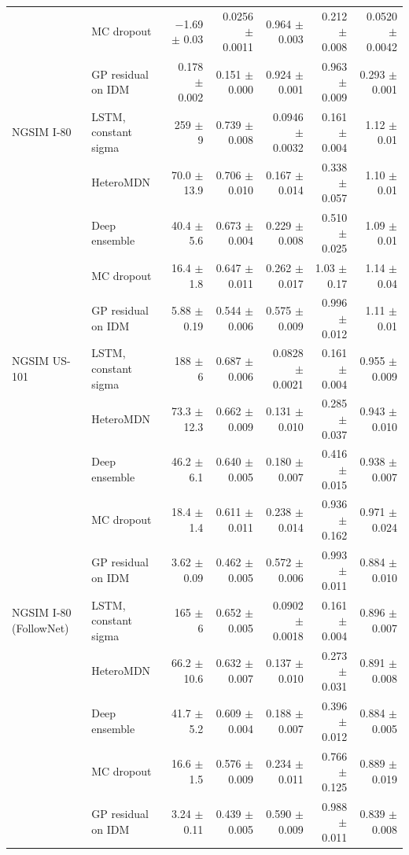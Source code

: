 \begin{table}[htbp]
\begin{tabular}{llrrrrr}
 & MC dropout & $-$1.69 $\pm$ 0.03 & 0.0256 $\pm$ 0.0011 & 0.964 $\pm$ 0.003 & 0.212 $\pm$ 0.008 & 0.0520 $\pm$ 0.0042 \\
 & GP residual on IDM & 0.178 $\pm$ 0.002 & 0.151 $\pm$ 0.000 & 0.924 $\pm$ 0.001 & 0.963 $\pm$ 0.009 & 0.293 $\pm$ 0.001 \\
\midrule
NGSIM I-80 & LSTM, constant sigma & 259 $\pm$ 9 & 0.739 $\pm$ 0.008 & 0.0946 $\pm$ 0.0032 & 0.161 $\pm$ 0.004 & 1.12 $\pm$ 0.01 \\
 & HeteroMDN & 70.0 $\pm$ 13.9 & 0.706 $\pm$ 0.010 & 0.167 $\pm$ 0.014 & 0.338 $\pm$ 0.057 & 1.10 $\pm$ 0.01 \\
 & Deep ensemble & 40.4 $\pm$ 5.6 & 0.673 $\pm$ 0.004 & 0.229 $\pm$ 0.008 & 0.510 $\pm$ 0.025 & 1.09 $\pm$ 0.01 \\
 & MC dropout & 16.4 $\pm$ 1.8 & 0.647 $\pm$ 0.011 & 0.262 $\pm$ 0.017 & 1.03 $\pm$ 0.17 & 1.14 $\pm$ 0.04 \\
 & GP residual on IDM & 5.88 $\pm$ 0.19 & 0.544 $\pm$ 0.006 & 0.575 $\pm$ 0.009 & 0.996 $\pm$ 0.012 & 1.11 $\pm$ 0.01 \\
\midrule
NGSIM US-101 & LSTM, constant sigma & 188 $\pm$ 6 & 0.687 $\pm$ 0.006 & 0.0828 $\pm$ 0.0021 & 0.161 $\pm$ 0.004 & 0.955 $\pm$ 0.009 \\
 & HeteroMDN & 73.3 $\pm$ 12.3 & 0.662 $\pm$ 0.009 & 0.131 $\pm$ 0.010 & 0.285 $\pm$ 0.037 & 0.943 $\pm$ 0.010 \\
 & Deep ensemble & 46.2 $\pm$ 6.1 & 0.640 $\pm$ 0.005 & 0.180 $\pm$ 0.007 & 0.416 $\pm$ 0.015 & 0.938 $\pm$ 0.007 \\
 & MC dropout & 18.4 $\pm$ 1.4 & 0.611 $\pm$ 0.011 & 0.238 $\pm$ 0.014 & 0.936 $\pm$ 0.162 & 0.971 $\pm$ 0.024 \\
 & GP residual on IDM & 3.62 $\pm$ 0.09 & 0.462 $\pm$ 0.005 & 0.572 $\pm$ 0.006 & 0.993 $\pm$ 0.011 & 0.884 $\pm$ 0.010 \\
\midrule
NGSIM I-80 (FollowNet) & LSTM, constant sigma & 165 $\pm$ 6 & 0.652 $\pm$ 0.005 & 0.0902 $\pm$ 0.0018 & 0.161 $\pm$ 0.004 & 0.896 $\pm$ 0.007 \\
 & HeteroMDN & 66.2 $\pm$ 10.6 & 0.632 $\pm$ 0.007 & 0.137 $\pm$ 0.010 & 0.273 $\pm$ 0.031 & 0.891 $\pm$ 0.008 \\
 & Deep ensemble & 41.7 $\pm$ 5.2 & 0.609 $\pm$ 0.004 & 0.188 $\pm$ 0.007 & 0.396 $\pm$ 0.012 & 0.884 $\pm$ 0.005 \\
 & MC dropout & 16.6 $\pm$ 1.5 & 0.576 $\pm$ 0.009 & 0.234 $\pm$ 0.011 & 0.766 $\pm$ 0.125 & 0.889 $\pm$ 0.019 \\
 & GP residual on IDM & 3.24 $\pm$ 0.11 & 0.439 $\pm$ 0.005 & 0.590 $\pm$ 0.009 & 0.988 $\pm$ 0.011 & 0.839 $\pm$ 0.008 \\

\end{tabular}
\end{table}
